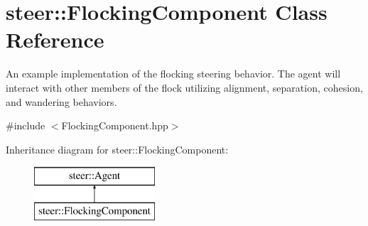 \hypertarget{classsteer_1_1_flocking_component}{\section{steer\-:\-:Flocking\-Component Class Reference}
\label{classsteer_1_1_flocking_component}
}


An example implementation of the flocking steering behavior. The agent will interact with other members of the flock utilizing alignment, separation, cohesion, and wandering behaviors.  




{\ttfamily \#include $<$Flocking\-Component.\-hpp$>$}

Inheritance diagram for steer\-:\-:Flocking\-Component\-:\begin{figure}[H]
\begin{center}
\leavevmode
\includegraphics[height=2.000000cm]{classsteer_1_1_flocking_component}
\end{center}
\end{figure}
